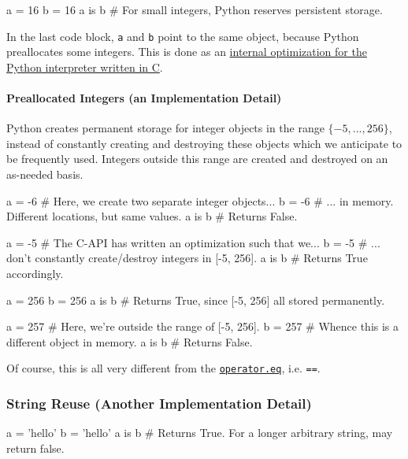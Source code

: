 \documentclass[12pt,letterpaper,twoside]{article}
\begin{document}
\begin{enumerate}
\begin{python}
a = 16
b = 16
a is b     # For small integers, Python reserves persistent storage.
\end{python}

In the last code block, \texttt{a} and \texttt{b} point to the same
object, because Python preallocates some integers. This is done as an 
\href{https://docs.python.org/3/c-api/long.html}{internal optimization for the Python interpreter written in C}.

\vspace{-2ex}
\paragraph{Preallocated Integers (an Implementation Detail)}
Python creates permanent storage for integer objects in the range $\{-5, ..., 256\}$, instead of 
constantly creating and destroying these objects which we anticipate to be frequently used.
Integers outside this range are created and destroyed on an as-needed basis.

\begin{python}
a = -6   # Here, we create two separate integer objects...
b = -6   # ... in memory. Different locations, but same values.
a is b   # Returns False.

a = -5   # The C-API has written an optimization such that we...
b = -5   # ... don't constantly create/destroy integers in [-5, 256].
a is b   # Returns True accordingly.

a = 256
b = 256
a is b   # Returns True, since [-5, 256] all stored permanently.

a = 257  # Here, we're outside the range of [-5, 256].
b = 257  # Whence this is a different object in memory.
a is b   # Returns False.
\end{python}

Of course, this is all very different from the \href{https://docs.python.org/3.4/library/operator.html#operator.eq}{\texttt{operator.eq}}, i.e. \texttt{==}.

\vspace{-3ex}
\subsubsection{String Reuse (Another Implementation Detail)}
\begin{python}
a = 'hello'
b = 'hello'
a is b      # Returns True. For a longer arbitrary string, may return false.
\end{python}

\vspace{-2ex}

\end{enumerate}
\end{document}
